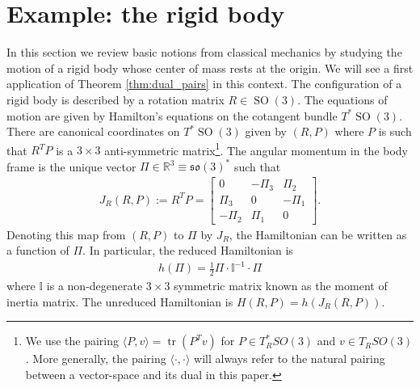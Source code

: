 \documentclass[12pt]{amsart}
\newcommand{\so}{\ensuremath{\mathfrak{so}}}
\DeclareMathOperator{\SO}{SO}
\DeclareMathOperator{\tr}{tr}
\begin{document}
\section{Example: the rigid body}
\label{sec:rigid_body}
  In this section we review basic notions from classical mechanics
by studying the motion of a rigid body whose center of mass rests
at the origin.
We will see a first application of Theorem \ref{thm:dual_pairs}
in this context.
The configuration of a rigid body is described by a
rotation matrix $R \in \SO(3)$.
The equations of motion are given by Hamilton's equations
on the cotangent bundle $T^*\SO(3)$.
There are canonical coordinates on $T^*\SO(3)$ given by $(R,P)$
where $P$ is such that $R^TP $ is a $3 \times 3$ anti-symmetric
matrix\footnote{%
  We use the pairing $\langle P, v \rangle = \tr(P^T v)$ for
  $P \in T^*_R SO(3)$ and $v \in T_R SO(3)$. More generally, the pairing $\langle \cdot , \cdot \rangle$ will always refer to the natural pairing between a vector-space and its dual in this paper.}.
The angular momentum in the body frame is the
unique vector $\Pi \in \mathbb{R}^3 \equiv \so(3)^*$ such that
\begin{align*}
  J_R(R,P) := R^TP = \begin{bmatrix}
    0 & -\Pi_3 & \Pi_2 \\
    \Pi_3 & 0 & -\Pi_1 \\
    -\Pi_2 & \Pi_1 & 0 
    \end{bmatrix}.
\end{align*}
Denoting this map from $(R,P)$ to $\Pi$ by $J_R$,
the Hamiltonian can be written as a function
of $\Pi$.  In particular, the reduced Hamiltonian is
\begin{align*}
  h(\Pi) = \frac{1}{2}\Pi \cdot \mathbb{I}^{-1} \cdot \Pi
\end{align*}
where $\mathbb{I}$ is a non-degenerate $3\times 3$ symmetric matrix
known as the moment of inertia matrix.
The unreduced Hamiltonian is $H(R,P) = h(J_R(R,P))$.
\end{document}
